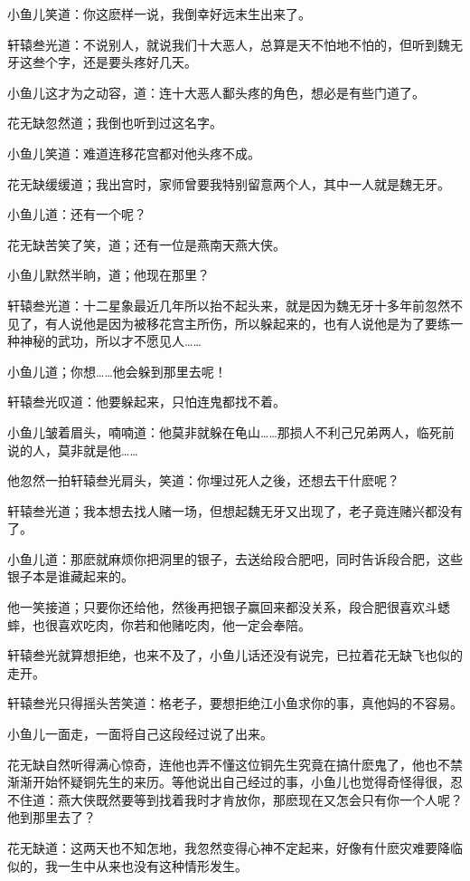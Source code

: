 \documentclass[12pt,oneside]{book}
\begin{document}
小鱼儿笑道：你这麽样一说，我倒幸好远末生出来了。

轩辕叁光道：不说别人，就说我们十大恶人，总算是天不怕地不怕的，但听到魏无牙这叁个字，还是要头疼好几天。

小鱼儿这才为之动容，道：连十大恶人鄱头疼的角色，想必是有些门道了。

花无缺忽然道；我倒也听到过这名字。

小鱼儿笑道：难道连移花宫都对他头疼不成。

花无缺缓缓道；我出宫时，家师曾要我特别留意两个人，其中一人就是魏无牙。

小鱼儿道：还有一个呢？

花无缺苦笑了笑，道；还有一位是燕南天燕大侠。

小鱼儿默然半晌，道；他现在那里？

轩辕叁光道：十二星象最近几年所以抬不起头来，就是因为魏无牙十多年前忽然不见了，有人说他是因为被移花宫主所伤，所以躲起来的，也有人说他是为了要练一种神秘的武功，所以才不愿见人\ldots\ldots{}

小鱼儿道；你想\ldots\ldots 他会躲到那里去呢！

轩辕叁光叹道：他要躲起来，只怕连鬼都找不着。

小鱼儿皱着眉头，喃喃道：他莫非就躲在龟山\ldots\ldots 那损人不利己兄弟两人，临死前说的人，莫非就是他\ldots\ldots{}

他忽然一拍轩辕叁光肩头，笑道：你埋过死人之後，还想去干什麽呢？

轩辕叁光道；我本想去找人赌一场，但想起魏无牙又出现了，老子竟连赌兴都没有了。

小鱼儿道：那麽就麻烦你把洞里的银子，去送给段合肥吧，同时告诉段合肥，这些银子本是谁藏起来的。

他一笑接道；只要你还给他，然後再把银子赢回来都没关系，段合肥很喜欢斗蟋蟀，也很喜欢吃肉，你若和他赌吃肉，他一定会奉陪。

轩辕叁光就算想拒绝，也来不及了，小鱼儿话还没有说完，已拉着花无缺飞也似的走开。

轩辕叁光只得摇头苦笑道：格老子，要想拒绝江小鱼求你的事，真他妈的不容易。

小鱼儿一面走，一面将自己这段经过说了出来。

花无缺自然听得满心惊奇，连他也弄不懂这位铜先生究竟在搞什麽鬼了，他也不禁渐渐开始怀疑铜先生的来历。等他说出自己经过的事，小鱼儿也觉得奇怪得很，忍不住道：燕大侠既然要等到找着我时才肯放你，那麽现在又怎会只有你一个人呢？他到那里去了？

花无缺道：这两天也不知怎地，我忽然变得心神不定起来，好像有什麽灾难要降临似的，我一生中从来也没有这种情形发生。
\end{document}

